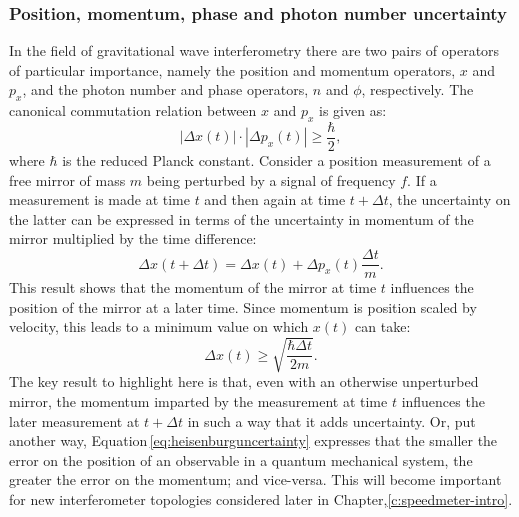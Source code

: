 \subsubsection{\label{sec:operator-uncertainty}Position, momentum, phase and photon number uncertainty}

In the field of gravitational wave interferometry there are two pairs of operators of particular importance, namely the position and momentum operators, $x$ and $p_x$, and the photon number and phase operators, $n$ and $\phi$, respectively. The canonical commutation relation between $x$ and $p_x$ is given as:
\begin{equation}
 | \Delta x\left( t \right) | \cdot |\Delta p_x\left( t \right) | \geq
\frac{\hbar}{2},
 \label{eq:heisenburguncertainty}
\end{equation}
where $\hbar$ is the reduced Planck constant. Consider a position measurement of a free mirror of mass $m$ being perturbed by a signal of frequency $f$. If a measurement is made at time $t$ and then again at time $t + \Delta t$, the uncertainty on the latter can be expressed in terms of the uncertainty in momentum of the mirror multiplied by the time difference:
\begin{equation}
 \Delta x \left( t + \Delta t \right) = \Delta x \left( t \right) + \Delta p_x
\left( t \right) \frac{\Delta t}{m}.
 \label{eq:heisenburgtime}
\end{equation}
This result shows that the momentum of the mirror at time $t$ influences the position of the mirror at a later time. Since momentum is position scaled by velocity, this leads to a minimum value on which $x \left( t \right)$ can take:
\begin{equation}
 \Delta x \left( t \right) \geq \sqrt{\frac{\hbar \Delta t}{2m}}.
\end{equation}
The key result to highlight here is that, even with an otherwise unperturbed mirror, the momentum imparted by the measurement at time $t$ influences the later measurement at $t + \Delta t$ in such a way that it adds uncertainty. Or, put another way, Equation\,\ref{eq:heisenburguncertainty} expresses that the smaller the error on the position of an observable in a quantum mechanical system, the greater the error on the momentum; and vice-versa. This will become important for new interferometer topologies considered later in Chapter,\ref{c:speedmeter-intro}.

